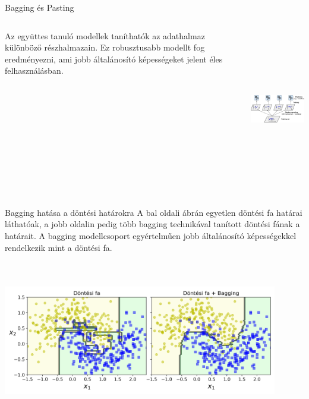 \documentclass[english, aspectratio=169]{beamer}
\begin{document}
\begin{frame}{Bagging és Pasting}
\begin{columns}
\begin{column}{.5\textwidth}
Az együttes tanuló modellek taníthatók az adathalmaz különböző részhalmazain. Ez robusztusabb modellt fog eredményezni, ami jobb általánosító képességeket jelent éles felhasználásban.
\end{column}
\begin{column}{.5\textwidth}
\begin{center}
\includegraphics[width=7cm, height=7cm, keepaspectratio]{images/ensemble_4.png}
\end{center}
\end{column}
\end{columns}
\end{frame}

\begin{frame}{Bagging hatása a döntési határokra}
A bal oldali ábrán egyetlen döntési fa határai láthatóak, a jobb oldalin pedig több bagging technikával tanított döntési fának a határait. A bagging modellcsoport egyértelműen jobb általánosító képességekkel rendelkezik mint a döntési fa.
\begin{center}
\includegraphics[width=12cm, height=7cm, keepaspectratio]{images/ensemble_5.png}
\end{center}
\end{frame}
\end{document}
